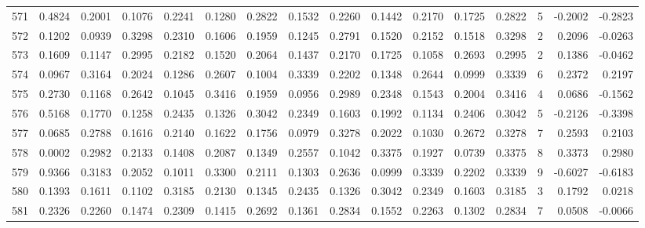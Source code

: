 \begin{tabular}{lrrrrrrrrrrrrrrr}
571 &      0.4824 &  0.2001 &  0.1076 &  0.2241 &  0.1280 &  0.2822 &  0.1532 &  0.2260 &  0.1442 &  0.2170 &   0.1725 &     0.2822 &      5 &                   -0.2002 &                    -0.2823 \\
572 &      0.1202 &  0.0939 &  0.3298 &  0.2310 &  0.1606 &  0.1959 &  0.1245 &  0.2791 &  0.1520 &  0.2152 &   0.1518 &     0.3298 &      2 &                    0.2096 &                    -0.0263 \\
573 &      0.1609 &  0.1147 &  0.2995 &  0.2182 &  0.1520 &  0.2064 &  0.1437 &  0.2170 &  0.1725 &  0.1058 &   0.2693 &     0.2995 &      2 &                    0.1386 &                    -0.0462 \\
574 &      0.0967 &  0.3164 &  0.2024 &  0.1286 &  0.2607 &  0.1004 &  0.3339 &  0.2202 &  0.1348 &  0.2644 &   0.0999 &     0.3339 &      6 &                    0.2372 &                     0.2197 \\
575 &      0.2730 &  0.1168 &  0.2642 &  0.1045 &  0.3416 &  0.1959 &  0.0956 &  0.2989 &  0.2348 &  0.1543 &   0.2004 &     0.3416 &      4 &                    0.0686 &                    -0.1562 \\
576 &      0.5168 &  0.1770 &  0.1258 &  0.2435 &  0.1326 &  0.3042 &  0.2349 &  0.1603 &  0.1992 &  0.1134 &   0.2406 &     0.3042 &      5 &                   -0.2126 &                    -0.3398 \\
577 &      0.0685 &  0.2788 &  0.1616 &  0.2140 &  0.1622 &  0.1756 &  0.0979 &  0.3278 &  0.2022 &  0.1030 &   0.2672 &     0.3278 &      7 &                    0.2593 &                     0.2103 \\
578 &      0.0002 &  0.2982 &  0.2133 &  0.1408 &  0.2087 &  0.1349 &  0.2557 &  0.1042 &  0.3375 &  0.1927 &   0.0739 &     0.3375 &      8 &                    0.3373 &                     0.2980 \\
579 &      0.9366 &  0.3183 &  0.2052 &  0.1011 &  0.3300 &  0.2111 &  0.1303 &  0.2636 &  0.0999 &  0.3339 &   0.2202 &     0.3339 &      9 &                   -0.6027 &                    -0.6183 \\
580 &      0.1393 &  0.1611 &  0.1102 &  0.3185 &  0.2130 &  0.1345 &  0.2435 &  0.1326 &  0.3042 &  0.2349 &   0.1603 &     0.3185 &      3 &                    0.1792 &                     0.0218 \\
581 &      0.2326 &  0.2260 &  0.1474 &  0.2309 &  0.1415 &  0.2692 &  0.1361 &  0.2834 &  0.1552 &  0.2263 &   0.1302 &     0.2834 &      7 &                    0.0508 &                    -0.0066 \\

\end{tabular}
